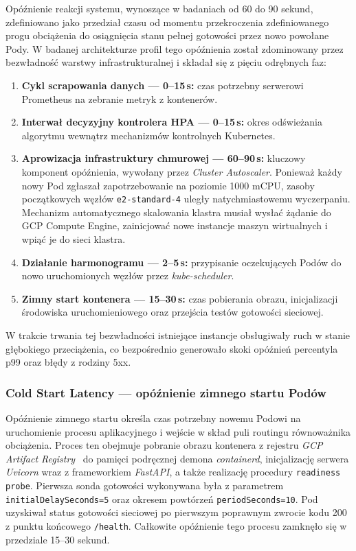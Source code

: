 Opóźnienie reakcji systemu, wynoszące w badaniach od 60 do 90 sekund, zdefiniowano jako przedział czasu od momentu przekroczenia zdefiniowanego progu obciążenia do osiągnięcia stanu pełnej gotowości przez nowo powołane Pody. W badanej architekturze profil tego opóźnienia został zdominowany przez bezwładność warstwy infrastrukturalnej i składał się z pięciu odrębnych faz:
\begin{enumerate}
  \item \textbf{Cykl scrapowania danych — 0--15\,s:} czas potrzebny serwerowi Prometheus na zebranie metryk z kontenerów.
  \item \textbf{Interwał decyzyjny kontrolera HPA — 0--15\,s:} okres odświeżania algorytmu wewnątrz mechanizmów kontrolnych Kubernetes.
  \item \textbf{Aprowizacja infrastruktury chmurowej — 60--90\,s:} kluczowy komponent opóźnienia, wywołany przez \textit{Cluster Autoscaler}. Ponieważ każdy nowy Pod zgłaszał zapotrzebowanie na poziomie 1000 mCPU, zasoby początkowych węzłów \texttt{e2-standard-4} uległy natychmiastowemu wyczerpaniu. Mechanizm automatycznego skalowania klastra musiał wysłać żądanie do GCP Compute Engine, zainicjować nowe instancje maszyn wirtualnych i wpiąć je do sieci klastra.
  \item \textbf{Działanie harmonogramu — 2--5\,s:} przypisanie oczekujących Podów do nowo uruchomionych węzłów przez \textit{kube-scheduler}.
  \item \textbf{Zimny start kontenera — 15--30\,s:} czas pobierania obrazu, inicjalizacji środowiska uruchomieniowego oraz przejścia testów gotowości sieciowej.
\end{enumerate}

W trakcie trwania tej bezwładności istniejące instancje obsługiwały ruch w stanie głębokiego przeciążenia, co bezpośrednio generowało skoki opóźnień percentyla p99 oraz błędy z rodziny 5xx.

\subsubsection{Cold Start Latency — opóźnienie zimnego startu Podów}

Opóźnienie zimnego startu określa czas potrzebny nowemu Podowi na uruchomienie procesu aplikacyjnego i wejście w skład puli routingu równoważnika obciążenia. Proces ten obejmuje pobranie obrazu kontenera z rejestru \textit{GCP Artifact Registry}~\cite{gcp-artifact-registry} do pamięci podręcznej demona \textit{containerd}, inicjalizację serwera \textit{Uvicorn} wraz z frameworkiem \textit{FastAPI}, a także realizację procedury \texttt{readiness probe}. Pierwsza sonda gotowości wykonywana była z parametrem \texttt{initialDelaySeconds=5} oraz okresem powtórzeń \texttt{periodSeconds=10}. Pod uzyskiwał status gotowości sieciowej po pierwszym poprawnym zwrocie kodu 200 z punktu końcowego \texttt{/health}. Całkowite opóźnienie tego procesu zamknęło się w przedziale 15--30 sekund.

